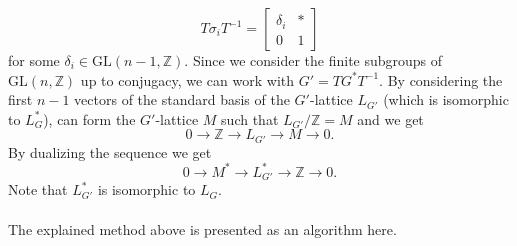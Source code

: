 \documentclass[a4paper, 14pt]{extarticle}
\theoremstyle{plain}
\theoremstyle{definition}
\newcommand{\Z}{\ensuremath{\mathbb{Z}}}
\begin{document}
$$T \sigma_i T^{-1} = \left[ \begin{array}{c|c}
\delta_i & \ast\\
\hline 0 & 1
\end{array} \right]
$$ 
for some $\delta_i \in \mathrm{GL}(n-1,\Z).$ Since we consider the finite subgroups of $\mathrm{GL}(n,\Z)$ up to conjugacy, we can work with $G' = TG^*T^{-1}$. By considering the first $n-1$ vectors of the standard basis of the $G'$-lattice $L_{G'}$ (which is isomorphic to $L^*_G$), can form the $G'$-lattice $M$ such that $L_{G'}/\Z = M$ and we get 
$$0 \longrightarrow \Z \longrightarrow L_{G'} \longrightarrow M \longrightarrow 0.$$
By dualizing the sequence we get  $$0 \longrightarrow M^* \longrightarrow L^*_{G'} \longrightarrow \Z \longrightarrow 0.$$
Note that $L^*_{G'}$ is isomorphic to $L_G$.\\
\\
The explained method above is presented as an algorithm here.
\end{document}
